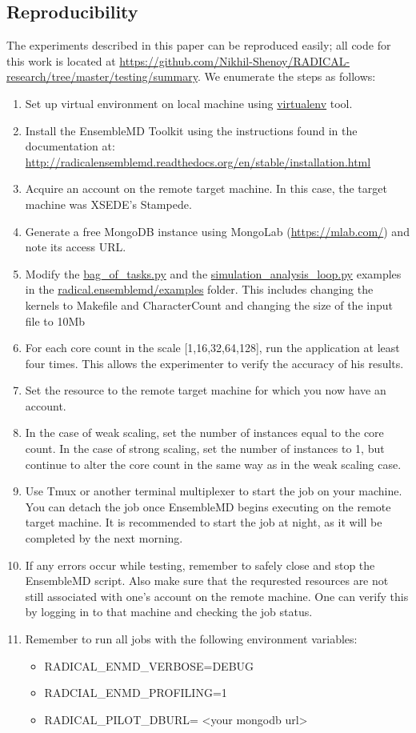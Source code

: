 \documentclass[]{article}
\begin{document}
	\subsection{Reproducibility}
		The experiments described in this paper can be reproduced easily; all code for this work is located at \url{https://github.com/Nikhil-Shenoy/RADICAL-research/tree/master/testing/summary}. We enumerate the steps as follows:
		\begin{enumerate}
			\item Set up virtual environment on local machine using \url{virtualenv} tool.
			\item Install the EnsembleMD Toolkit using the instructions found in the documentation at: \\
				  \url{http://radicalensemblemd.readthedocs.org/en/stable/installation.html}
			\item Acquire an account on the remote target machine. In this case, the target machine was XSEDE's Stampede.
			\item Generate a free MongoDB instance using MongoLab (\url{https://mlab.com/}) and note its access URL.	
			\item Modify the \url{bag_of_tasks.py} and the \url{simulation_analysis_loop.py} examples in the \url{radical.ensemblemd/examples} folder. This includes changing the kernels to Makefile and CharacterCount and changing the size of the input file to 10Mb
			\item For each core count in the scale [1,16,32,64,128], run the application at least four times. This allows the experimenter to verify the accuracy of his results.
			\item Set the resource to the remote target machine for which you now have an account.
			\item In the case of weak scaling, set the number of instances equal to the core count. In the case of strong scaling, set the number of instances to 1, but continue to alter the core count in the same way as in the weak scaling case.
			\item Use Tmux or another terminal multiplexer to start the job on your machine. You can detach the job once EnsembleMD begins executing on the remote target machine. It is recommended to start the job at night, as it will be completed by the next morning.
			\item If any errors occur while testing, remember to safely close and stop the EnsembleMD script. Also make sure that the requrested resources are not still associated with one's account on the remote machine. One can verify this by logging in to that machine and checking the job status.
			\item Remember to run all jobs with the following environment variables:
				\begin{itemize}
					\item RADICAL\_ENMD\_VERBOSE=DEBUG
					\item RADCIAL\_ENMD\_PROFILING=1
					\item RADICAL\_PILOT\_DBURL= <your mongodb url>
				\end{itemize}
		\end{enumerate}
\end{document}
